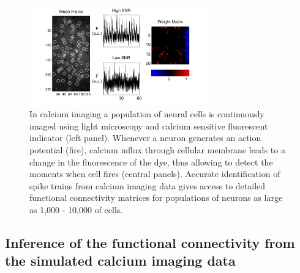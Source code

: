 \begin{figure}[h]
\centering
\includegraphics[width=3in]{../figs/FigureA1_real_data.pdf}
\caption{In calcium imaging a population of neural cells is continuously
imaged using light microscopy and calcium sensitive fluorescent indicator
(left panel).
Whenever a neuron generates an action potential (fire), calcium influx through
cellular membrane leads to a change in the fluorescence of the dye, thus
allowing to detect the moments when cell fires (central panels).
Accurate identification of spike trains from calcium imaging data gives
access to detailed functional connectivity matrices for populations
of neurons as large as 1,000 - 10,000 of cells.}
\label{fig:egfluor}
\end{figure}


\subsection{Inference of the functional connectivity from the simulated calcium imaging data} \label{sec:results:inference}

%

